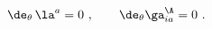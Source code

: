 \begin{equation} \label{de_theta_la}
  \de_\theta\, \la^a = 0\ ,\qquad \de_\theta \ga^\A_{ia} = 0\ .
 \end{equation}

